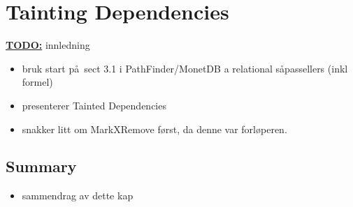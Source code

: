 \chapter{Tainting Dependencies}
\label{sect:translation}


\textbf{\underline{\LARGE TODO:}} innledning
\begin{itemize}
  \item bruk start p\aa~sect 3.1 i  PathFinder/MonetDB a relational s\aa passellers (inkl formel)
  \item presenterer Tainted Dependencies
  \item snakker litt om MarkXRemove f\o rst, da denne var forl\o peren.
\end{itemize}





\section{Summary}
\label{sect:trans:summary}
\begin{itemize}
  \item sammendrag av dette kap
\end{itemize}